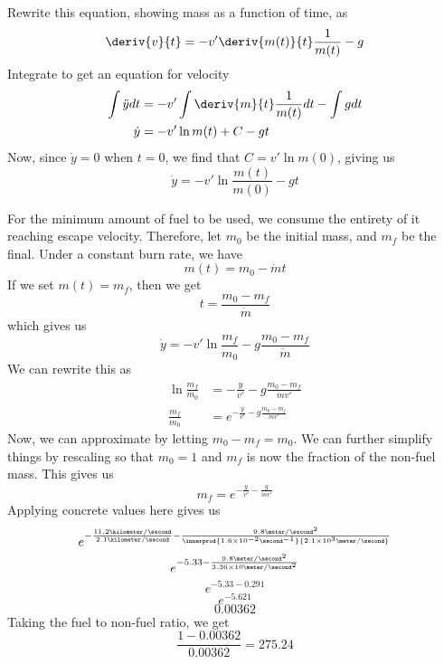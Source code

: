Rewrite this equation, showing mass as a function of time, as
\[ \deriv{v}{t} = -v'\deriv{m(t)}{t}\frac{1}{m(t)} - g\]
Integrate to get an equation for velocity
\begin{align*}
  \int \ddot{y}dt
  &=
  -v'\int \deriv{m}{t}\frac{1}{m(t)}dt - \int g dt \\
  \dot{y} &= -v'\ln{m(t)} + C - gt
\end{align*}
Now, since $\dot{y} = 0$ when $t = 0$, we find that $C = v'\ln{m(0)}$,
giving us
\[ \dot{y} = -v'\ln{\frac{m(t)}{m(0)}} - gt \]

For the minimum amount of fuel to be used, we consume the entirety of
it reaching escape velocity.  Therefore, let $m_0$ be the initial
mass, and $m_f$ be the final.  Under a constant burn rate, we have
\[ m(t) = m_0 - \dot{m}t \]
If we set $m(t) = m_f$, then we get
\[t = \frac{m_0 - m_f}{\dot{m}}\]
which gives us
\[ \dot{y} = -v'\ln{\frac{m_f}{m_0}} - g\frac{m_0 - m_f}{\dot{m}} \]
We can rewrite this as
\begin{align*}
  \ln{\frac{m_f}{m_0}} &= -\frac{\dot{y}}{v'} - g\frac{m_0 - m_f}{\dot{m}v'} \\
  \frac{m_f}{m_0} &= e^{-\frac{\dot{y}}{v'} - g\frac{m_0 - m_f}{\dot{m}v'}}
\end{align*}
Now, we can approximate by letting $m_0 - m_f = m_0$.  We can further
simplify things by rescaling so that $m_0 = 1$ and $m_f$ is now the
fraction of the non-fuel mass.  This gives us
\[ m_f = e^{-\frac{\dot{y}}{v'} - \frac{g}{\dot{m}v'}} \]
Applying concrete values here gives us
\[ e^{-\frac{11.2 \kilometer/\second}{2.1 \kilometer/\second} - \frac{9.8 \meter/\second^2}{\innerprod{1.6\times 10^{-2} \second^{-1}}{2.1 \times 10^3 \meter/\second}}}\]
\[ e^{-5.33 - \frac{9.8 \meter/\second^2}{3.36 \times 10 \meter/\second^2}}\]
\[ e^{-5.33 - 0.291}\]
\[ e^{-5.621}\]
\[ 0.00362 \]
Taking the fuel to non-fuel ratio, we get
\[\frac{1-0.00362}{0.00362} = 275.24\]
